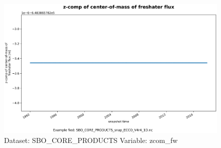\begin{figure}[H]
\centering
\includegraphics[width=\textwidth]{../images/plots/oneD_plots/SBO_Core_Products/zcom_fw.png}
\caption{Dataset: SBO\_CORE\_PRODUCTS Variable: zcom\_fw}
\label{tab:table-SBO_CORE_PRODUCTS_zcom_fw-Plot}
\end{figure}
\pagebreak
